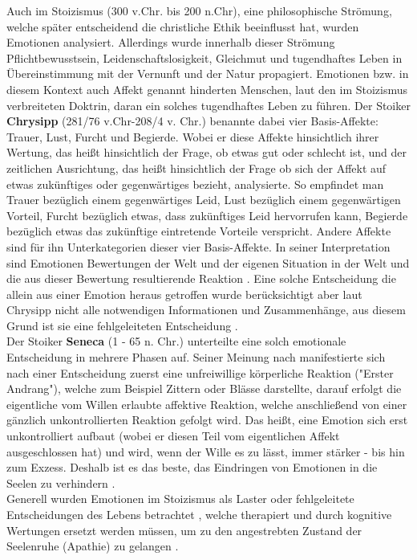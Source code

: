 %
%
Auch im Stoizismus (300 v.Chr. bis 200 n.Chr), eine philosophische Strömung, welche später entscheidend die christliche Ethik beeinflusst hat, wurden Emotionen analysiert. Allerdings wurde innerhalb dieser Strömung Pflichtbewusstsein, Leidenschaftslosigkeit, Gleichmut und tugendhaftes Leben in Übereinstimmung mit der Vernunft und der Natur propagiert. Emotionen bzw. in diesem Kontext auch Affekt genannt hinderten Menschen, laut den im Stoizismus verbreiteten Doktrin, daran ein solches tugendhaftes Leben zu führen. Der Stoiker \textbf{Chrysipp} (281/76 v.Chr-208/4 v. Chr.) benannte dabei vier Basis-Affekte: Trauer, Lust, Furcht und Begierde. 
Wobei er diese Affekte hinsichtlich ihrer Wertung, das heißt hinsichtlich der Frage, ob etwas gut oder schlecht ist, und der zeitlichen Ausrichtung, das heißt hinsichtlich der Frage ob sich der Affekt auf etwas zukünftiges oder gegenwärtiges bezieht, \cite{richard_sorabji_emotion_2000} analysierte. So empfindet man Trauer bezüglich einem gegenwärtiges Leid, Lust bezüglich einem gegenwärtigen Vorteil, Furcht bezüglich etwas, dass zukünftiges Leid hervorrufen kann, Begierde bezüglich etwas das zukünftige eintretende Vorteile verspricht. 
Andere Affekte sind für ihn Unterkategorien dieser vier Basis-Affekte. In seiner Interpretation sind Emotionen Bewertungen der Welt und der eigenen Situation in der Welt und die aus dieser Bewertung resultierende Reaktion \cite{richard_sorabji_emotion_2000}. Eine solche Entscheidung die allein aus einer Emotion heraus getroffen wurde berücksichtigt aber laut Chrysipp nicht alle notwendigen Informationen und Zusammenhänge, aus diesem Grund ist sie eine fehlgeleiteten Entscheidung \cite{richard_sorabji_emotion_2000}.\\
%
%
Der Stoiker \textbf{Seneca} (1 - 65 n. Chr.) unterteilte eine solch emotionale Entscheidung in mehrere Phasen auf. Seiner Meinung nach manifestierte sich nach einer Entscheidung zuerst eine unfreiwillige körperliche Reaktion ("Erster Andrang"), welche zum Beispiel Zittern oder Blässe darstellte, darauf erfolgt die eigentliche vom Willen erlaubte affektive Reaktion, welche anschließend von einer gänzlich unkontrollierten Reaktion gefolgt wird. Das heißt,  eine Emotion sich erst unkontrolliert aufbaut (wobei er diesen Teil vom eigentlichen Affekt ausgeschlossen hat) und wird, wenn der Wille es zu lässt, immer stärker - bis hin zum Exzess. Deshalb ist es das beste, das Eindringen von Emotionen in die Seelen zu verhindern \cite{motto_additional_2009}.\\
Generell wurden Emotionen im Stoizismus als Laster oder fehlgeleitete Entscheidungen des Lebens betrachtet \cite{robert_c._solomon_philosophy_2008}, welche therapiert und durch kognitive Wertungen ersetzt werden müssen, um zu den angestrebten Zustand der Seelenruhe (Apathie) zu gelangen \cite{schafer_passiones_2013}.\\
